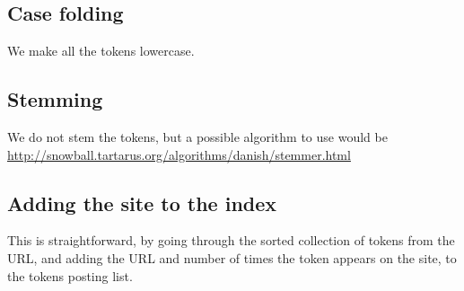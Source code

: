\subsection{Case folding}
We make all the tokens lowercase.

\subsection{Stemming}
We do not stem the tokens, but a possible algorithm to use would be \url{http://snowball.tartarus.org/algorithms/danish/stemmer.html}

\subsection{Adding the site to the index}
This is straightforward, by going through the sorted collection of tokens from the URL, and adding the URL and number of times the token appears on the site, to the tokens posting list.